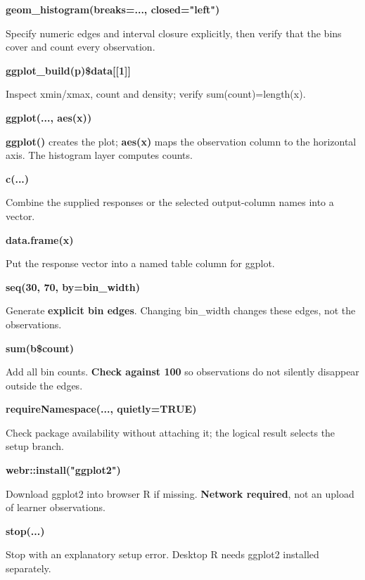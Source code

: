\documentclass[11pt,a4paper]{article}
\begin{document}
\par\noindent\textbf{geom\_histogram(breaks=..., closed="left")}

Specify numeric edges and interval closure explicitly, then verify that the bins cover and count every observation.

\par\noindent\textbf{ggplot\_build(p)\$data[[1]]}

Inspect xmin/xmax, count and density; verify sum(count)=length(x).

\par\noindent\textbf{ggplot(..., aes(x))}

\textbf{ggplot()} creates the plot; \textbf{aes(x)} maps the observation column to the horizontal axis. The histogram layer computes counts.

\par\noindent\textbf{c(...)}

Combine the supplied responses or the selected output-column names into a vector.

\par\noindent\textbf{data.frame(x)}

Put the response vector into a named table column for ggplot.

\par\noindent\textbf{seq(30, 70, by=bin\_width)}

Generate \textbf{explicit bin edges}. Changing bin\_width changes these edges, not the observations.

\par\noindent\textbf{sum(b\$count)}

Add all bin counts. \textbf{Check against 100} so observations do not silently disappear outside the edges.

\par\noindent\textbf{requireNamespace(..., quietly=TRUE)}

Check package availability without attaching it; the logical result selects the setup branch.

\par\noindent\textbf{webr::install("ggplot2")}

Download ggplot2 into browser R if missing. \textbf{Network required}, not an upload of learner observations.

\par\noindent\textbf{stop(...)}

Stop with an explanatory setup error. Desktop R needs ggplot2 installed separately.
\end{document}
